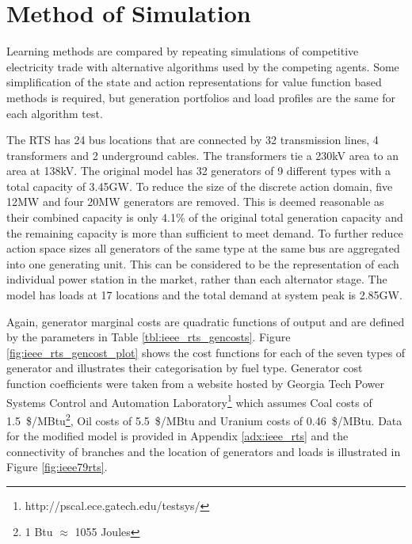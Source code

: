 \section{Method of Simulation}
Learning methods are compared by repeating simulations of
competitive electricity trade with alternative algorithms used by the competing
agents. Some simplification of the state and action representations for value
function based methods is required, but generation portfolios and load profiles
are the same for each algorithm test.

The RTS has 24 bus locations that are connected by 32 transmission lines, 4
transformers and 2 underground cables. The transformers tie a 230kV area to an
area at 138kV.  The original model has 32 generators of 9 different types with a
total capacity of 3.45GW.  To reduce the size of the discrete action domain,
five 12MW and four 20MW generators are removed.  This is deemed reasonable as
their combined capacity is only 4.1\% of the original total generation capacity
and the remaining capacity is more than sufficient to meet demand.  To further
reduce action space sizes all generators of the same type at the same bus are
aggregated into one generating unit. This can be considered to be the
representation of each individual power station in the market, rather than each
alternator stage.  The model has loads at 17 locations and the total demand at
system peak is 2.85GW.

Again, generator marginal costs are quadratic functions of output and are
defined by the parameters in Table \ref{tbl:ieee_rts_gencosts}. Figure \ref{fig:ieee_rts_gencost_plot} shows
the cost functions for each of the seven types of generator and illustrates
their categorisation by fuel type.  Generator cost function coefficients were
taken from a website hosted by Georgia Tech Power Systems Control and Automation
Laboratory\footnote{http://pscal.ece.gatech.edu/testsys/} which assumes Coal
costs of 1.5~\$/MBtu\footnote{1 Btu $\approx$ 1055 Joules}, Oil costs of
5.5~\$/MBtu and Uranium costs of 0.46~\$/MBtu.  Data for the modified model is
provided in Appendix \ref{adx:ieee_rts} and the connectivity of branches and the
location of generators and loads is illustrated in Figure \ref{fig:ieee79rts}.

